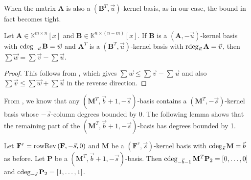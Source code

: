 When the matrix $\mathbf{A}$ is also a $\left(\mathbf{B}^{T},\vec{u}\right)$-kernel
basis, as in our case, the bound in fact becomes tight.
\begin{lem}
\label{lem:mutualMinimalNullspaceBasisDegrees}Let $\mathbf{A}\in\mathbb{K}^{m\times n}[x]$
and $\mathbf{B}\in\mathbb{K}^{n\times(n-m)}\left[x\right]$. If $\mathbf{B}$
is a $(\mathbf{A},-\vec{u})$-kernel basis with $\cdeg_{-\vec{u}}\mathbf{B}=\vec{w}$
and $\mathbf{A}^{T}$ is a $\left(\mathbf{B}^{T},\vec{u}\right)$-kernel
basis with $\rdeg_{\vec{u}}\mathbf{A}=\vec{v}$, then $\sum\vec{w}=\sum\vec{v}-\sum\vec{u}$.\end{lem}
\begin{proof}
This follows from ,
which gives $\sum\vec{w}\le\sum\vec{v}-\sum\vec{u}$ and also $\sum\vec{v}\le\sum\vec{w}+\sum\vec{u}$
in the reverse direction.
\end{proof}
From , we know that any
$\left(\mathbf{M}^{T},\vec{b}+1,-\vec{s}\right)$-basis contains a
$\left(\mathbf{M}^{T},-\vec{s}\right)$-kernel basis whose $-\vec{s}$-column
degrees bounded by 0. The following lemma shows that the remaining
part of the $\left(\mathbf{M}^{T},\vec{b}+1,-\vec{s}\right)$-basis
has degrees bounded by 1.
\begin{lem}
\label{lem:nullspaceOrderbasisDegree}Let $\mathbf{F}^{r}=\operatorname{rowRev}\left(\mathbf{F},-\vec{s},0\right)$
and $\mathbf{M}$ be a $(\mathbf{F}^{r},\vec{s})$-kernel basis with
$\cdeg_{\vec{s}}\mathbf{M}=\vec{b}$ as before. Let $\mathbf{P}$
be a $\left(\mathbf{M}^{T},\vec{b}+1,-\vec{s}\right)$-basis. Then
$\cdeg_{-\vec{b}-1}\mathbf{M}^{T}\mathbf{P}_{2}=\left[0,\dots,0\right]$
and $\cdeg_{-\vec{s}}\mathbf{P}_{2}=\left[1,\dots,1\right]$.\end{lem}
